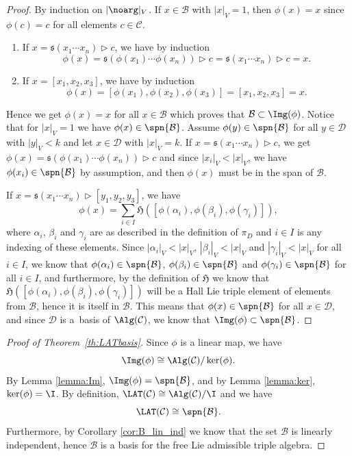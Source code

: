 \documentclass[pdftex]{sigma}
\numberwithin{equation}{section}
\begin{document}
\begin{proof}
By induction on $|\noarg |_V$. %
If $x \in \mathcal{B}$ with $|x|_V=1$, then $\phi(x) = x$ since $\phi(c)=c$ for all elements $c \in \mathcal{C}$. %
\begin{enumerate}\itemsep=0pt
 \item[(i)] If $x = \mathfrak{s}(x_1 \cdots x_n) \rhd c$, we have by induction
 \[
 \phi(x) = \mathfrak{s}(\phi(x_1) \cdots \phi(x_n))\rhd c = \mathfrak{s}(x_1 \cdots x_n) \rhd c = x.
 \]
 \item[(ii)] If $x = [x_1, x_2, x_3]$, we have by induction
 \[
 \phi(x) = [\phi(x_1),\phi(x_2),\phi(x_3)] = [x_1, x_2, x_3] = x.
 \]
\end{enumerate}
Hence we get $\phi(x)=x$ for all $x \in \mathcal{B}$ which proves that $\mathcal{B} \subset \Img(\phi)$.
Notice that for $|x|_V=1$ we have $\phi(x) \in \spn\{\mathcal{B} \}$. Assume $\phi(y) \in \spn \{\mathcal{B}\}$ for all $y\in \mathcal{D}$ with $|y|_V < k$ and let $x \in \mathcal{D}$ with $|x|_V=k$. If $x = \mathfrak{s}(x_1 \cdots x_n) \rhd c$, we get $\phi(x) = \mathfrak{s}( \phi(x_1) \cdots \phi(x_n)) \rhd c$ and since $|x_i|_V < |x|_V$, we have $\phi(x_i) \in \spn\{ \mathcal{B} \}$ by assumption, and then $\phi(x)$ must be in the span of $\mathcal{B}$.

If $x = \mathfrak{s}(x_1 \cdots x_n) \rhd [y_1, y_2 ,y_3]$, we have
\[
\phi(x) = \sum_{i \in I} \mathfrak{H}([\phi(\alpha_i), \phi(\beta_i), \phi(\gamma_i)]),
\]
where $\alpha_i$, $\beta_i$ and $\gamma_i$ are as described in the definition of $\pi_D$ and $i\in I$ is any indexing of these elements. Since $|\alpha_i|_V<|x|_V$, $|\beta_i|_V<|x|_V$ and $|\gamma_i|_V<|x|_V$ for all $i \in I$, we know that $\phi(\alpha_i) \in \spn \{ \mathcal{B} \}$, $\phi(\beta_i) \in \spn \{ \mathcal{B} \}$ and $\phi(\gamma_i) \in \spn \{ \mathcal{B} \}$ for all $i \in I$, and furthermore, by the definition of $\mathfrak{H}$ we know that $\mathfrak{H}([\phi(\alpha_i), \phi(\beta_i), \phi(\gamma_i)])$ will be a Hall Lie triple element of elements from $\mathcal{B}$, hence it is itself in $\mathcal{B}$.
This means that $\phi(x) \in \spn \{\mathcal{B}\}$ for all $x \in \mathcal{D}$, and since $\mathcal{D}$ is a~basis of $\Alg(\mathcal{C})$, we know that $\Img(\phi) \subset \spn \{\mathcal{B}\}$.
\end{proof}

\begin{proof}[Proof of Theorem~\ref{th:LATbasis}]%
Since $\phi$ is a linear map, we have
\[
\Img(\phi) \cong \Alg(\mathcal{C})/\ker(\phi).
\]
By Lemma \ref{lemma:Im}, $\Img(\phi) = \spn \{\mathcal{B} \}$, and by Lemma \ref{lemma:ker}, $\ker(\phi) = \I$. By definition, $\LAT(\mathcal{C}) \cong \Alg(\mathcal{C})/ \I$ and we have
\[
\LAT(\mathcal{C}) \cong \spn \{ \mathcal{B} \}.
\]
Furthermore, by Corollary \ref{cor:B_lin_ind} we know that the set $\mathcal{B}$ is linearly independent, hence $\mathcal{B}$ is a basis for the free Lie admissible triple algebra.
\end{proof}
\end{document}
